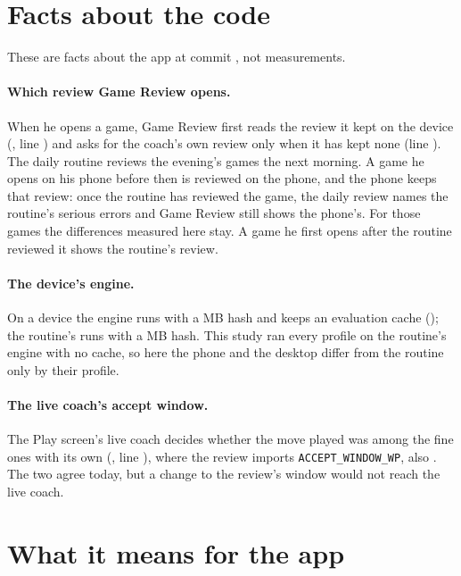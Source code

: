\documentclass[11pt]{article}
\begin{document}
\section{Facts about the code}

These are facts about the app at commit \texttt{\AppCommit}, not measurements.

\paragraph{Which review Game Review opens.} When he opens a game, Game Review first reads the review
it kept on the device (\GameReviewFile, line \KeptLine) and asks for the coach's own review only
when it has kept none (line \CoachLine). The daily routine reviews the evening's games the next
morning. A game he opens on his phone before then is reviewed on the phone, and the phone keeps that
review: once the routine has reviewed the game, the daily review names the routine's serious errors
and Game Review still shows the phone's. For those games the differences measured here stay. A game
he first opens after the routine reviewed it shows the routine's review.

\paragraph{The device's engine.} On a device the engine runs with a \DeviceHash{} MB hash and keeps
an evaluation cache (\DeviceEngineFile); the routine's runs with a \NodeHash{} MB hash. This study
ran every profile on the routine's engine with no cache, so here the phone and the desktop differ
from the routine only by their profile.

\paragraph{The live coach's accept window.} The Play screen's live coach decides whether the move
played was among the fine ones with its own \AcceptWindow{} (\VerdictFile, line \VerdictLine), where
the review imports \texttt{ACCEPT\_WINDOW\_WP}, also \AcceptWindow. The two agree today, but a change
to the review's window would not reach the live coach.

\section{What it means for the app}
\end{document}
